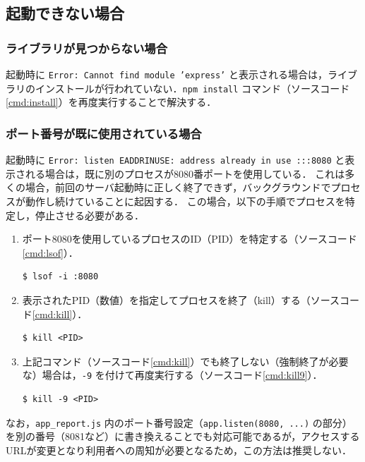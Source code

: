 \subsection{起動できない場合}
\subsubsection{ライブラリが見つからない場合}
起動時に \texttt{Error: Cannot find module 'express'} と表示される場合は，ライブラリのインストールが行われていない．\texttt{npm install} コマンド（ソースコード\ref{cmd:install}）を再度実行することで解決する．

\subsubsection{ポート番号が既に使用されている場合}
起動時に \texttt{Error: listen EADDRINUSE: address already in use :::8080} と表示される場合は，既に別のプロセスが8080番ポートを使用している．
これは多くの場合，前回のサーバ起動時に正しく終了できず，バックグラウンドでプロセスが動作し続けていることに起因する．
この場合，以下の手順でプロセスを特定し，停止させる必要がある．

\begin{enumerate}
    \item ポート8080を使用しているプロセスのID（PID）を特定する（ソースコード\ref{cmd:lsof}）．
\begin{lstlisting}[caption=PIDの確認, label=cmd:lsof]
$ lsof -i :8080
\end{lstlisting}
    \item 表示されたPID（数値）を指定してプロセスを終了（kill）する（ソースコード\ref{cmd:kill}）．
\begin{lstlisting}[caption=プロセスの終了, label=cmd:kill]
$ kill <PID>
\end{lstlisting}
    \item 上記コマンド（ソースコード\ref{cmd:kill}）でも終了しない（強制終了が必要な）場合は，\texttt{-9} を付けて再度実行する（ソースコード\ref{cmd:kill9}）．
\begin{lstlisting}[caption=プロセスの強制終了, label=cmd:kill9]
$ kill -9 <PID>
\end{lstlisting}
\end{enumerate}

なお，\texttt{app\_report.js} 内のポート番号設定（\texttt{app.listen(8080, ...)} の部分）を別の番号（8081など）に書き換えることでも対応可能であるが，アクセスするURLが変更となり利用者への周知が必要となるため，この方法は推奨しない．

